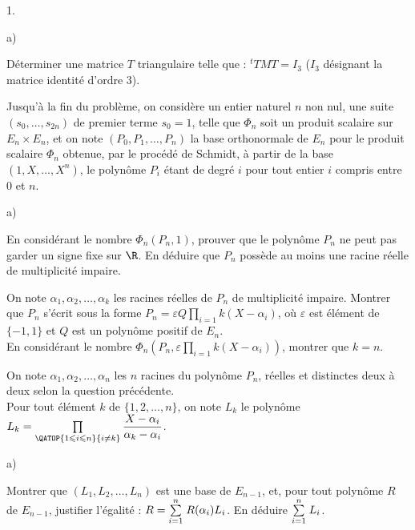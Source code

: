 \documentclass[11pt]{article}%
\begin{document}
\begin{noliste}{1.}
\begin{noliste}{a)}
\item Déterminer une matrice $T$ triangulaire telle que : $^{t}TMT =
I_{3}$ ($I_{3}$ désignant la matrice identité d'ordre $3$).
\end{noliste}

\item Jusqu'à la fin du problème, on considère un entier naturel $n$
non
nul, une suite $(s_{0},\dots,s_{2n})$ de premier terme $s_{0} = 1$,
telle que
$\Phi_{n}$ soit un produit scalaire sur $E_{n}\times E_{n}$, et on note
$(P_{0},P_{1},\dots,P_{n})$ la base orthonormale de $E_{n}$ pour le
produit
scalaire $\Phi_{n}$ obtenue, par le procédé de Schmidt, à partir de la
base
$(1,X,\dots,X^{n})$, le polynôme $P_{i}$ étant de degré $i$ pour tout
entier $i$ compris entre $0$ et $n$.

\begin{noliste}{a)}
 \setlength{\itemsep}{2mm}
\item En considérant le nombre $\Phi_{n}(P_{n},1)$, prouver que le
polynôme
$P_{n}$ ne peut pas garder un signe fixe sur $\R$. En déduire que
$P_{n}$ possède au moins une racine réelle de multiplicité impaire.

\item On note $\alpha_{1},\alpha_{2},\dots,\alpha_{k}$ les racines
réelles de $P_{n}$ de multiplicité impaire. Montrer que $P_{n}$ s'écrit
sous
la forme $P_{n} = \varepsilon Q\prod\limits_{i = 1}{k}(X-\alpha_{i})$,
où $\varepsilon $ est élément de $\{-1,1\}$ et $Q$ est un polynôme
positif de $E_{n}$.\\
En considérant le nombre $\Phi_{n}(P_{n},\varepsilon
\prod\limits_{i = 1}{k}(X-\alpha_{i}))$, montrer que $k = n$.
\end{noliste}

\item On note $\alpha_{1},\alpha_{2},\dots,\alpha_{n}$ les $n$ racines
du polynôme $P_{n}$, réelles et distinctes deux à deux selon la
question précédente.\\
Pour tout élément $k$ de $\{1,2,\dots,n\}$, on note $L_{k}$ le polynôme
$L_{k} = \prod\limits_{\QATOP{1\leq i\leq n}{i\not =
k}}\dfrac{X-\alpha_{i}}{\alpha_{k}-\alpha_{i}}$.

\begin{noliste}{a)}
 \setlength{\itemsep}{2mm}
\item Montrer que $(L_{1},L_{2},\dots,L_{n})$ est une base de
$E_{n-1}$,
et, pour tout polynôme $R$ de $E_{n-1}$, justifier l'égalité : $R =
{\textstyle\sum\limits_{i = 1}^{n}}\hspace{.1cm}R(\alpha_{i})L_{i}$. En déduire ${\textstyle\sum\limits_{i = 1}^{n}}\hspace{.1cm}L_{i}$.


\end{noliste}
\end{noliste}
\end{document}

